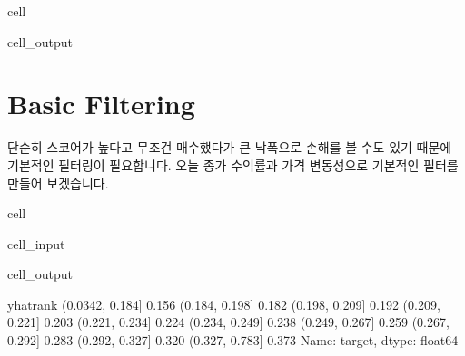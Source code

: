 \documentclass[letterpaper,10pt,english]{jupyterBook}
\begin{document}
\begin{sphinxuseclass}{cell}
\begin{sphinxVerbatimOutput}
\begin{sphinxuseclass}{cell_output}
\noindent{}

\end{sphinxuseclass}\end{sphinxVerbatimOutput}

\end{sphinxuseclass}

\section{Basic Filtering}
\label{\detokenize{chapter5/5.2.3_GAM:basic-filtering}}
\sphinxAtStartPar
단순히 스코어가 높다고 무조건 매수했다가 큰 낙폭으로 손해를 볼 수도 있기 때문에 기본적인 필터링이 필요합니다. 오늘 종가 수익률과 가격 변동성으로 기본적인 필터를 만들어 보겠습니다.

\begin{sphinxuseclass}{cell}\begin{sphinxVerbatimInput}

\begin{sphinxuseclass}{cell_input}
\begin{sphinxVerbatim}[commandchars=\\\{\}]
\PYG{p}{[}\PYG{p}{]}  
\PYG{p}{[}\PYG{p}{]}  \PYG{p}{[}\PYG{p}{]} 
\PYG{p}{[}\PYG{p}{]}
\end{sphinxVerbatim}

\end{sphinxuseclass}\end{sphinxVerbatimInput}
\begin{sphinxVerbatimOutput}

\begin{sphinxuseclass}{cell_output}
\begin{sphinxVerbatim}[commandchars=\\\{\}]
yhat\PYGZus{}rank
(0.0342, 0.184]   0.156
(0.184, 0.198]    0.182
(0.198, 0.209]    0.192
(0.209, 0.221]    0.203
(0.221, 0.234]    0.224
(0.234, 0.249]    0.238
(0.249, 0.267]    0.259
(0.267, 0.292]    0.283
(0.292, 0.327]    0.320
(0.327, 0.783]    0.373
Name: target, dtype: float64
\end{sphinxVerbatim}

\end{sphinxuseclass}\end{sphinxVerbatimOutput}

\end{sphinxuseclass}
\end{document}
